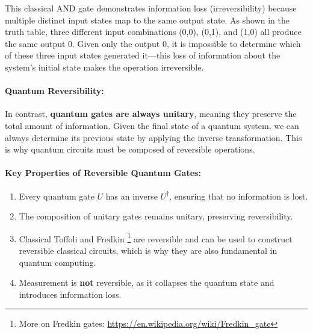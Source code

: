 \noindent This classical AND gate demonstrates information loss
(irreversibility) because multiple distinct input states map to the same
output state. As shown in the truth table, three different input
combinations (0,0), (0,1), and (1,0) all produce the same output 0. Given
only the output 0, it is impossible to determine which of these three input
states generated it—this loss of information about the system's initial
state makes the operation irreversible.

\paragraph{Quantum Reversibility:}
In contrast, \textbf{quantum gates are always unitary}, meaning they
preserve the total amount of information. Given the final state of a
quantum system, we can always determine its previous state by applying the
inverse transformation. This is why quantum circuits must be composed of
reversible operations.


\paragraph{Key Properties of Reversible Quantum Gates:}
\begin{enumerate}
  \item Every quantum gate \( U \) has an inverse \( U^\dagger \), ensuring
    that no information is lost.
  \item The composition of unitary gates remains unitary, preserving
    reversibility.
  \item Classical Toffoli and Fredkin
    \footnote{More on Fredkin gates: \url{https://en.wikipedia.org/wiki/Fredkin_gate}}
    are reversible and can be used to construct reversible classical circuits,
    which is why they are also fundamental in quantum computing.
  \item Measurement is \textbf{not} reversible, as it collapses the quantum
    state and introduces information loss.
\end{enumerate}

